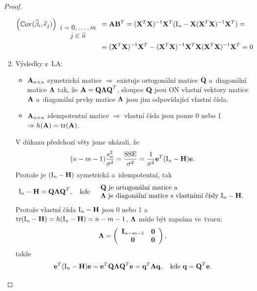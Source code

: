 \begin{proof}
\begin{enumerate}
 \begin{align*}
 \left(\mathbb{C}\mathrm{ov}(\widehat{\beta}_i, \widehat{e}_j) \right)_{ \begin{array}{c}
 i = 0,\dots, m \\
 j  \in\widehat{n}
 \end{array} } & = \textbf{A} \textbf{B}^T
 = (\mathbf{X}^T \mathbf{X})^{-1} \mathbf{X}^T (\text{I}_n - \mathbf{X} (\mathbf{X}^T \mathbf{X})^{-1} \mathbf{X}^T) = \\
& = (\mathbf{X}^T \mathbf{X})^{-1} \mathbf{X}^T - (\mathbf{X}^T \mathbf{X})^{-1} \mathbf{X}^T \mathbf{X} (\mathbf{X}^T \mathbf{X})^{-1} \mathbf{X}^T = 0
 \end{align*}
 
\item Výsledky z~LA:
\begin{itemize}
\item $\textbf{A}_{n \times n}$ symetrická matice $\Rightarrow$ existuje ortogonální matice $\textbf{Q}$ a~diagonální matice $\mathbf{\Lambda}$ tak, že $\textbf{A} = \textbf{Q} \mathbf{\Lambda} \textbf{Q}^T$, sloupce $\textbf{Q}$ jsou ON vlastní vektory matice $\textbf{A}$ a~diagonální prvky matice $\mathbf{\Lambda}$ jsou jim odpovídající vlastní čísla.
\item $\textbf{A}_{n \times n}$ idempotentní matice $\Rightarrow$ vlastní čísla jsou pouze 0 nebo 1 $\Rightarrow h(\textbf{A}) = \mathrm{tr}(\textbf{A})$.
\end{itemize}
V důkazu předchozí věty jsme ukázali, že
$$(n - m -1) \frac{s_n^2}{\sigma^2} = \frac{\mathrm{SSE}}{\sigma^2} = \frac{1}{\sigma^2} \mathbf{e}^T (\text{I}_n - \textbf{H}) \mathbf{e}.$$
Protože je $(\text{I}_n - \textbf{H})$ symetrická a~idempotentní, tak
 $$
 \text{I}_n - \textbf{H} = \textbf{Q} \mathbf{\Lambda} \textbf{Q}^T,  \quad \text{kde} \quad
 \begin{array}{l}
 {\textbf{Q}\text{ je ortogonální matice a}} \\
{\mathbf{\Lambda}  \text{ je diagonální matice s~vlastními čísly } \text{I}_n - \textbf{H}}.
 \end{array}
 $$
Protože vlastní čísla $\text{I}_n - \textbf{H}$ jsou 0 nebo 1 a~$\mathrm{tr}(\text{I}_n - \textbf{H}) = h(\text{I}_n - \textbf{H}) = n - m - 1$, \linebreak
 $\mathbf{\Lambda}$ může být zapsána ve~tvaru:
 $$
 \mathbf{\Lambda} = 
 \left(\begin{array}{cc}
 \textbf{I}_{n-m-1} & \boldsymbol{0}  \\
 \boldsymbol{0} & \boldsymbol{0}
 \end{array} \right),
 $$
takže
 $$
 \mathbf{e}^T (\text{I}_n - \textbf{H}) \mathbf{e} = \mathbf{e}^T \textbf{Q} \mathbf{\Lambda} \textbf{Q}^T \mathbf{e} = \textbf{q}^T \mathbf{\Lambda} \textbf{q}, \quad \text{kde } \textbf{q} = \textbf{Q}^T \mathbf{e}.
 $$
 

\end{enumerate}
\end{proof}
